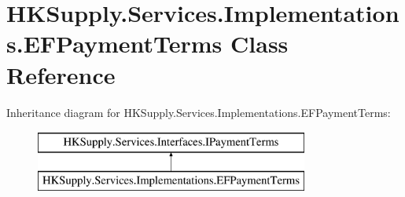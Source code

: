 \hypertarget{class_h_k_supply_1_1_services_1_1_implementations_1_1_e_f_payment_terms}{}\section{H\+K\+Supply.\+Services.\+Implementations.\+E\+F\+Payment\+Terms Class Reference}
\label{class_h_k_supply_1_1_services_1_1_implementations_1_1_e_f_payment_terms}
Inheritance diagram for H\+K\+Supply.\+Services.\+Implementations.\+E\+F\+Payment\+Terms\+:\begin{figure}[H]
\begin{center}
\leavevmode
\includegraphics[height=2.000000cm]{class_h_k_supply_1_1_services_1_1_implementations_1_1_e_f_payment_terms}
\end{center}
\end{figure}
